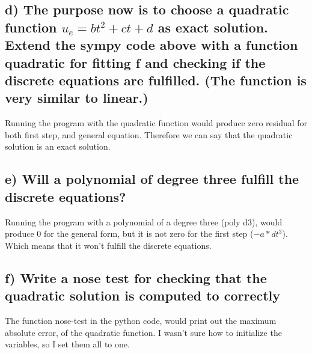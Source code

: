 \documentclass{article}
\begin{document}
    \newpage
    \subsection*{ d) The purpose now is to choose a quadratic function $u_e=b t^2 + ct + d$ as exact solution. Extend the sympy code above with a function quadratic for fitting f and checking if the discrete equations are fulfilled. (The function is very similar to linear.)}
    
    Running the program with the quadratic function would produce zero residual for both first step, and general equation. Therefore we can say that the quadratic solution is an exact solution.
    
    
    \subsection*{e) Will a polynomial of degree three fulfill the discrete equations?}
    
    Running the program with a polynomial of a degree three (poly d3), would produce 0 for the general form, but it is not zero for the first step ($-a*dt^3$). Which means that it won't fulfill the discrete equations.
    
    
    \subsection*{f) Write a nose test for checking that the quadratic solution is computed to correctly}
    
    The function nose-test in the python code, would print out the maximum absolute error, of the quadratic function. I wasn't sure how to initialize the variables, so I set them all to one. 
    
\end{document}
